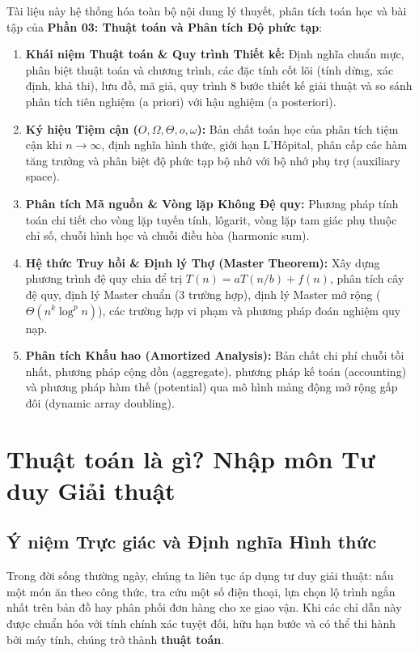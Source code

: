 \documentclass[11pt,a4paper]{article}
\begin{document}
\begin{notebox}
Tài liệu này hệ thống hóa toàn bộ nội dung lý thuyết, phân tích toán học và bài tập của \textbf{Phần 03: Thuật toán và Phân tích Độ phức tạp}:
\begin{enumerate}[itemsep=1pt,topsep=2pt]
    \item \textbf{Khái niệm Thuật toán \& Quy trình Thiết kế:} Định nghĩa chuẩn mực, phân biệt thuật toán và chương trình, các đặc tính cốt lõi (tính dừng, xác định, khả thi), lưu đồ, mã giả, quy trình 8 bước thiết kế giải thuật và so sánh phân tích tiên nghiệm (a priori) với hậu nghiệm (a posteriori).
    \item \textbf{Ký hiệu Tiệm cận ($O, \Omega, \Theta, o, \omega$):} Bản chất toán học của phân tích tiệm cận khi $n \to \infty$, định nghĩa hình thức, giới hạn L'Hôpital, phân cấp các hàm tăng trưởng và phân biệt độ phức tạp bộ nhớ với bộ nhớ phụ trợ (auxiliary space).
    \item \textbf{Phân tích Mã nguồn \& Vòng lặp Không Đệ quy:} Phương pháp tính toán chi tiết cho vòng lặp tuyến tính, lôgarit, vòng lặp tam giác phụ thuộc chỉ số, chuỗi hình học và chuỗi điều hòa (harmonic sum).
    \item \textbf{Hệ thức Truy hồi \& Định lý Thợ (Master Theorem):} Xây dựng phương trình đệ quy chia để trị $T(n) = aT(n/b) + f(n)$, phân tích cây đệ quy, định lý Master chuẩn (3 trường hợp), định lý Master mở rộng ($\Theta(n^k \log^p n)$), các trường hợp vi phạm và phương pháp đoán nghiệm quy nạp.
    \item \textbf{Phân tích Khấu hao (Amortized Analysis):} Bản chất chi phí chuỗi tồi nhất, phương pháp cộng dồn (aggregate), phương pháp kế toán (accounting) và phương pháp hàm thế (potential) qua mô hình mảng động mở rộng gấp đôi (dynamic array doubling).
\end{enumerate}
\end{notebox}

\tableofcontents
\newpage

\section{Thuật toán là gì? Nhập môn Tư duy Giải thuật}

\subsection{Ý niệm Trực giác và Định nghĩa Hình thức}
Trong đời sống thường ngày, chúng ta liên tục áp dụng tư duy giải thuật: nấu một món ăn theo công thức, tra cứu một số điện thoại, lựa chọn lộ trình ngắn nhất trên bản đồ hay phân phối đơn hàng cho xe giao vận. Khi các chỉ dẫn này được chuẩn hóa với tính chính xác tuyệt đối, hữu hạn bước và có thể thi hành bởi máy tính, chúng trở thành \textbf{thuật toán}.
\end{document}
